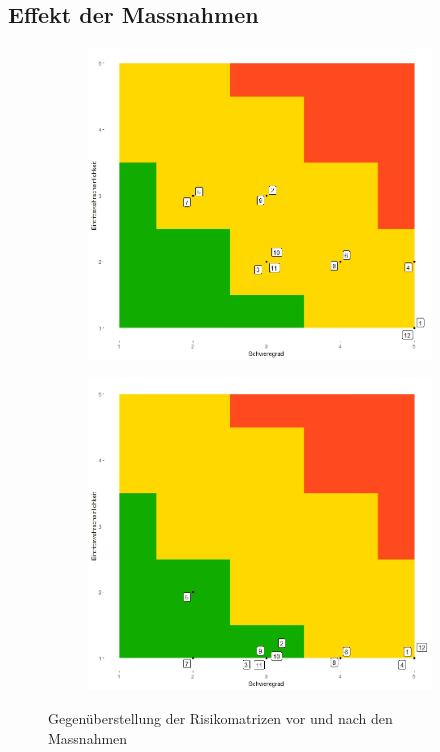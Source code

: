 \documentclass[a4paper]{report}
\begin{document}
\newpage
\subsection{Effekt der Massnahmen}
\label{ssec:MassEffekt}
\begin{figure}[h!]
	\centering
	\begin{subfigure}[b]{0.45\textwidth}
		\includegraphics[keepaspectratio,width=\textwidth]{Risikomatrix}
	\end{subfigure}
	\begin{subfigure}[b]{0.45\textwidth}
		\includegraphics[keepaspectratio,width=\textwidth]{Risikomatrix_nachher}
	\end{subfigure}
	\caption{Gegenüberstellung der Risikomatrizen vor und nach den Massnahmen}
	\label{fig:Gegenueberstellung}
\end{figure}
\end{document}
